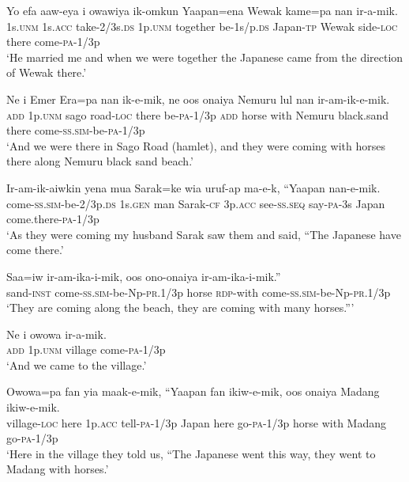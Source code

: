 \ea
\gll  Yo  efa  aaw-eya  i  owawiya  ik-omkun   Yaapan=ena  Wewak  kame=pa  nan  ir-a-mik. \\
1s.\textsc{unm}  1s.\textsc{acc}  take-2/3s.\textsc{ds}  1p.\textsc{unm}  together  be-1s/p.\textsc{ds}  Japan-\textsc{tp}  Wewak  side-\textsc{loc}  there  come-\textsc{pa}-1/3p \\
\glt ‘He married me and when we were together the Japanese came from the direction of Wewak there.’ \\
\z


\ea
\gll  Ne  i  Emer  Era=pa  nan  ik-e-mik,  ne  oos   onaiya  Nemuru  lul  nan  ir-am-ik-e-mik. \\
\textsc{add}  1p.\textsc{unm}  sago  road-\textsc{loc}  there  be-\textsc{pa}-1/3p  \textsc{add}  horse with  Nemuru  black.sand  there  come-\textsc{ss}.\textsc{sim}-be-\textsc{pa}-1/3p \\
\glt ‘And we were there in Sago Road (hamlet), and they were coming with horses there along Nemuru black sand beach.’ \\
\z


\ea
\gll  Ir-am-ik-aiwkin  yena  mua  Sarak=ke  wia  uruf-ap  ma-e-k,  “Yaapan  nan-e-mik. \\
come-\textsc{ss}.\textsc{sim}-be-2/3p.\textsc{ds}  1s.\textsc{gen}  man  Sarak-\textsc{cf}  3p.\textsc{acc}   see-\textsc{ss.seq}  say-\textsc{pa}-3s  Japan  come.there-\textsc{pa}-1/3p \\
\glt ‘As they were coming my husband Sarak saw them and said, “The Japanese have come there.’ \\
\z


\ea
\gll  Saa=iw  ir-am-ika-i-mik,  oos  ono-onaiya       ir-am-ika-i-mik.” \\
sand-\textsc{inst}  come-\textsc{ss}.\textsc{sim}-be-Np-\textsc{pr}.1/3p  horse  \textsc{rdp}-with come-\textsc{ss}.\textsc{sim}-be-Np-\textsc{pr}.1/3p \\
\glt ‘They are coming along the beach, they are coming with many horses.”’ \\
\z


\ea
\gll  Ne  i  owowa  ir-a-mik. \\
\textsc{add}  1p.\textsc{unm}  village  come-\textsc{pa}-1/3p \\
\glt ‘And we came to the village.’ \\
\z


\ea
\gll  Owowa=pa  fan  yia  maak-e-mik,  “Yaapan  fan  ikiw-e-mik,       oos  onaiya  Madang  ikiw-e-mik. \\
village-\textsc{loc}  here  1p.\textsc{acc}  tell-\textsc{pa}-1/3p  Japan  here  go-\textsc{pa}-1/3p horse  with  Madang  go-\textsc{pa}-1/3p \\
\glt ‘Here in the village they told us, “The Japanese went this way, they went to Madang with horses.’ \\
\z


